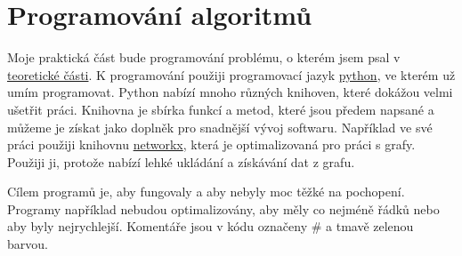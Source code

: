 \chapter{Programování algoritmů}
\label{chap:programovani}

Moje praktická část bude programování problému, o kterém jsem psal v \hyperref[part:teoreticka-cast]{teoretické části}. K programování použiji programovací jazyk \href{https://www.python.org/}{python}, ve kterém už umím programovat. Python nabízí mnoho různých knihoven, které dokážou velmi ušetřit práci. Knihovna je sbírka funkcí a metod, které jsou předem napsané a můžeme je získat jako doplněk pro snadnější vývoj softwaru. Například ve své práci použiji knihovnu \href{https://networkx.org/}{networkx}, která je optimalizovaná pro práci s grafy. Použiji ji, protože nabízí lehké ukládání a získávání dat z grafu.

Cílem programů je, aby fungovaly a aby nebyly moc těžké na pochopení. Programy například nebudou optimalizovány, aby měly co nejméně řádků nebo aby byly nejrychlejší. Komentáře jsou v kódu označeny \textcolor{commentgreen}{\#} a \textcolor{commentgreen}{tmavě zelenou barvou}.

% 


